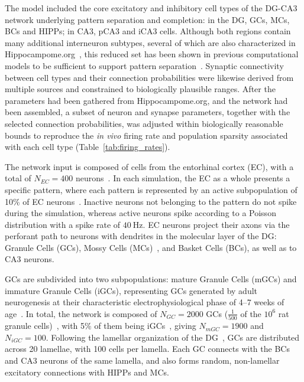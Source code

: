 The model included the core excitatory and inhibitory cell types of the DG-CA3 network underlying pattern separation and
completion: in the DG, GCs, MCs, BCs and HIPPs; in CA3, pCA3 and iCA3 cells. Although both regions contain many additional
interneuron subtypes, several of which are also characterized in
Hippocampome.org~\parencite{wheelerHippocampomeorg2023}, this reduced set has been shown in previous computational models to be
sufficient to support pattern separation~\parencite{chavlisDendrites2017, kimEffect2024, yangDynamic2025}. Synaptic connectivity
between cell types and their connection probabilities were likewise derived from multiple sources and constrained to biologically
plausible ranges. After the parameters had been gathered from Hippocampome.org, and the network had been assembled, a subset of
neuron and synapse parameters, together with the selected connection probabilities, was adjusted within biologically reasonable
bounds to reproduce the \textit{in vivo} firing rate and population sparsity associated with each cell type
(Table~\ref{tab:firing_rates}).



The network input is composed of cells from the entorhinal cortex (EC), with a total of $N_{EC} = 400$
neurons~\parencite{amaralChapter1990, kimAdult2024}. In each simulation, the EC as a whole presents a specific pattern, where each
pattern is represented by an active subpopulation of 10\% of EC neurons~\parencite{mcnaughtonDead1991}. Inactive neurons not
belonging to the pattern do not spike during the simulation, whereas active neurons spike according to a Poisson distribution with
a spike rate of $\SI{40}{\hertz}$. EC neurons project their axons via the perforant path to neurons with dendrites in the
molecular layer of the DG\@: Granule Cells (GCs), Mossy Cells (MCs)~\parencite{scharfmanHilar2013}, and Basket Cells (BCs), as
well as to CA3 neurons.

GCs are subdivided into two subpopulations: mature Granule Cells (mGCs) and immature Granule Cells (iGCs), representing GCs
generated by adult neurogenesis at their characteristic electrophysiological phase of 4--7 weeks of
age~\parencite{aimoneRegulation2014}. In total, the network is composed of $N_{GC} = 2000$ GCs ($\frac{1}{500}$ of the $10^6$ rat
granule cells)~\parencite{westUnbiased1991}, with 5\% of them being iGCs~\parencite{cameronAdult2001}, giving $N_{mGC} = 1900$ and
$N_{iGC} = 100$. Following the lamellar organization of the DG~\parencite{sloviterUpdating2012}, GCs are distributed across 20
lamellae, with 100 cells per lamella. Each GC connects with the BCs and CA3 neurons of the same lamella, and also forms
random, non-lamellar excitatory connections with HIPPs and MCs.

